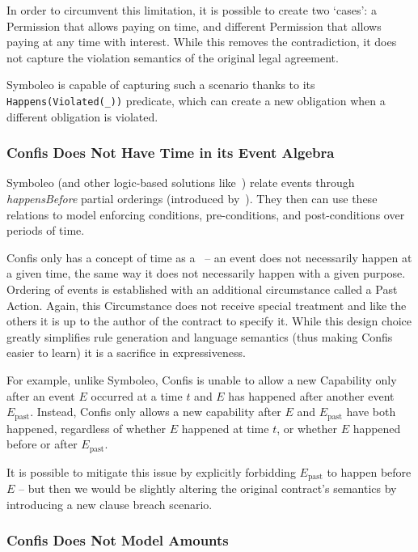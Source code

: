 In order to circumvent this limitation, it is possible to create two `cases': a Permission that allows paying on time, and different Permission that allows paying at any time with interest.
While this removes the contradiction, it does not capture the violation semantics of the original legal agreement.

Symboleo is capable of capturing such a scenario thanks to its \texttt{Happens(Violated(\_))} predicate, which can create a new obligation when a different obligation is violated.

\subsubsection{Confis Does Not Have Time in its Event Algebra}
\label{subsubsec:limits-time}

Symboleo (and other logic-based solutions like~\cite{knottenbeltContractDriven}) relate events through \emph{happensBefore} partial orderings (introduced by~\cite{kowalski1989logicEventBased}).
They then can use these relations to model enforcing conditions, pre-conditions, and post-conditions over periods of time.

Confis only has a concept of time as a~ -- an event does not necessarily happen at a given time, the same way it does not necessarily happen with a given purpose.
Ordering of events is established with an additional circumstance called a Past Action.
Again, this Circumstance does not receive special treatment and like the others it is up to the author of the contract to specify it.
While this design choice greatly simplifies rule generation and language semantics (thus making Confis easier to learn) it is a sacrifice in expressiveness.

For example, unlike Symboleo, Confis is unable to allow a new Capability only after an event $E$ occurred at a time $t$ and $E$ has happened after another event $E_{\text{past}}$.
Instead, Confis only allows a new capability after $E$ and $E_{\text{past}}$ have both happened, regardless of whether $E$ happened at time $t$, or whether $E$ happened before or after $E_{\text{past}}$.

It is possible to mitigate this issue by explicitly forbidding $E_{\text{past}}$ to happen before $E$ -- but then we would be slightly altering the original contract's semantics by introducing a new clause breach scenario.

\subsubsection{Confis Does Not Model Amounts}
\label{subsubsec:limits-amounts}


